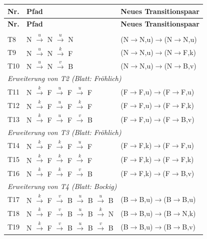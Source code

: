 \documentclass[
	fontsize=12pt,          %
	paper=a4,               %
	numbers=noenddot,       %
	listof=totoc,           %
	listof=entryprefix,     %
	listof=nochaptergap,    %
	bibliography=totoc,     %
	parskip=half,           %
	openany                 %
]{scrbook}
\begin{document}
\begin{longtable}{| p{0.7cm} | p{7.0cm} | p{4.3cm} |}
	\hline
	\textbf{Nr.} & \textbf{Pfad} & \textbf{Neues Transitionspaar} \\ \hline
	\endfirsthead
	\hline
	\textbf{Nr.} & \textbf{Pfad} & \textbf{Neues Transitionspaar} \\ \hline
	\endhead
	\hline
	\endfoot
	\multicolumn{3}{|l|}{\textit{Erweiterung von T1 (Blatt: Neutral)}} \\ \hline
	T8 & N $\xrightarrow{u}$ N $\xrightarrow{u}$ N & (N$\to$N,u)$\to$(N$\to$N,u) \\ \hline
	T9 & N $\xrightarrow{u}$ N $\xrightarrow{k}$ F & (N$\to$N,u)$\to$(N$\to$F,k) \\ \hline
	T10 & N $\xrightarrow{u}$ N $\xrightarrow{v}$ B & (N$\to$N,u)$\to$(N$\to$B,v) \\ \hline
	\multicolumn{3}{|l|}{\textit{Erweiterung von T2 (Blatt: Fröhlich)}} \\ \hline
	T11 & N $\xrightarrow{k}$ F $\xrightarrow{u}$ F $\xrightarrow{u}$ F & (F$\to$F,u)$\to$(F$\to$F,u) \\ \hline
	T12 & N $\xrightarrow{k}$ F $\xrightarrow{u}$ F $\xrightarrow{k}$ F & (F$\to$F,u)$\to$(F$\to$F,k) \\ \hline
	T13 & N $\xrightarrow{k}$ F $\xrightarrow{u}$ F $\xrightarrow{v}$ B & (F$\to$F,u)$\to$(F$\to$B,v) \\ \hline
	\multicolumn{3}{|l|}{\textit{Erweiterung von T3 (Blatt: Fröhlich)}} \\ \hline
	T14 & N $\xrightarrow{k}$ F $\xrightarrow{k}$ F $\xrightarrow{u}$ F & (F$\to$F,k)$\to$(F$\to$F,u) \\ \hline
	T15 & N $\xrightarrow{k}$ F $\xrightarrow{k}$ F $\xrightarrow{k}$ F & (F$\to$F,k)$\to$(F$\to$F,k) \\ \hline
	T16 & N $\xrightarrow{k}$ F $\xrightarrow{k}$ F $\xrightarrow{v}$ B & (F$\to$F,k)$\to$(F$\to$B,v) \\ \hline
	\multicolumn{3}{|l|}{\textit{Erweiterung von T4 (Blatt: Bockig)}} \\ \hline
	T17 & N $\xrightarrow{k}$ F $\xrightarrow{v}$ B $\xrightarrow{u}$ B $\xrightarrow{u}$ B & (B$\to$B,u)$\to$(B$\to$B,u) \\ \hline
	T18 & N $\xrightarrow{k}$ F $\xrightarrow{v}$ B $\xrightarrow{u}$ B $\xrightarrow{k}$ N & (B$\to$B,u)$\to$(B$\to$N,k) \\ \hline
	T19 & N $\xrightarrow{k}$ F $\xrightarrow{v}$ B $\xrightarrow{u}$ B $\xrightarrow{v}$ B & (B$\to$B,u)$\to$(B$\to$B,v) \\ \hline

\end{longtable}
\end{document}
